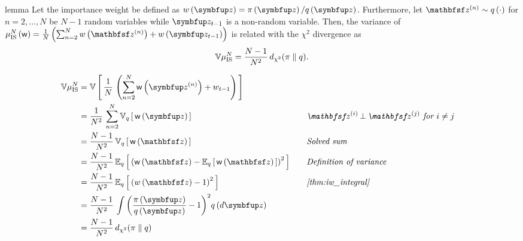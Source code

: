 \begin{theoremEnd}{lemma}\label{thm:iw_variance}
  Let the importance weight be defined as \(w\left(\vz\right) = \pi\left(\vz\right)/q\left(\vz\right)\).
  Furthermore, let \(\rvvz^{(n)} \sim q\left(\cdot\right)\) for \(n = 2, \ldots, N\) be \(N-1\) random variables while \(\vz_{t-1}\) is a non-random variable.
  Then, the variance of
  \( \mu_{\mathrm{IS}}^N\left(\rvw\right) = \frac{1}{N}\left(\sum^{N}_{n=2} w\left(\rvvz^{(n)}\right) + w\left(\vz_{t-1}\right) \right) \) is related with the \(\chi^2\) divergence as
  \begin{align*}
    \mathbb{V}{\mu_{\mathrm{IS}}^N}
    =
    \frac{N-1}{N^2}\,
    d_{\chi^2}(\pi\parallel q).
  \end{align*}
\end{theoremEnd}
\begin{proofEnd}
  \begin{alignat}{2}
    \mathbb{V}\mu_{\mathrm{IS}}^N
    &=
    \V{
      \frac{1}{N} \, \left( \sum^{N}_{n=2} \rvw\left(\vz^{(n)}\right) + w_{t-1} \right)
    }
    \nonumber
    \\
    &=
    \frac{1}{N^2}\,
    \sum^{N}_{n=2}
    \Vsub{q}{
       \rvw\left(\vz\right)
    }
    &&\quad\text{\textit{\(\rvvz^{(i)}\,\bot\,\rvvz^{(j)}\) for \(i \neq j\)}}
    \nonumber
    \\
    &=
    \frac{N-1}{N^2}\,
    \Vsub{q}{
       \rvw\left(\rvvz\right)
    }
    &&\quad\text{\textit{Solved sum}}
    \nonumber
    \\
    &=
    \frac{N-1}{N^2}\,
    \Esub{q}{
      {\left(
      \rvw\left(\rvvz\right)
      -
      \Esub{q}{
        \rvw\left(\rvvz\right)
      }
      \right)}^2
    }
    &&\quad\text{\textit{Definition of variance}}
    \nonumber
    \\
    &=
    \frac{N-1}{N^2}\,
    \Esub{q}{
      {\left(
      w\left(\rvvz\right)
      -
      1
      \right)}^2
    }
    &&\quad\text{\textit{\cref{thm:iw_integral}}}
    \nonumber
    \\
    &=
    \frac{N-1}{N^2}\,
    \int {\left( \frac{\pi\left(\vz\right)}{q\left(\vz\right)}  - 1 \right)}^2 q\left(d\vz\right)
    \nonumber
    \\
    &=
    \frac{N-1}{N^2}\,
    \DChi{\pi}{q}
    \nonumber
  \end{alignat}
\end{proofEnd}

